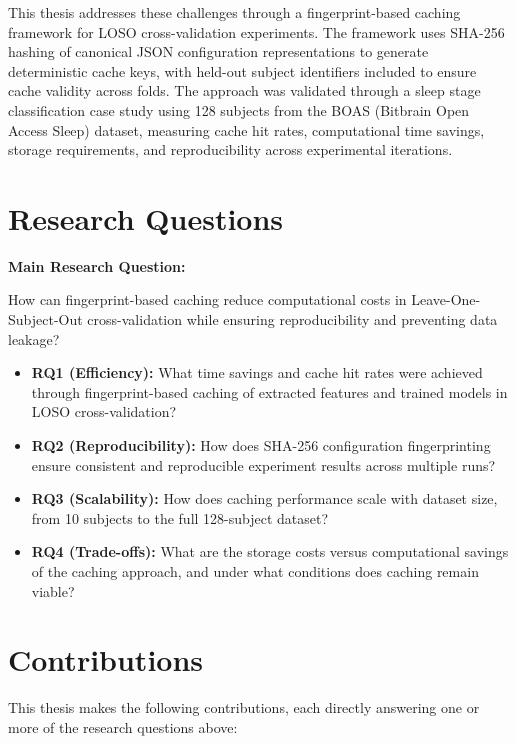 This thesis addresses these challenges through a fingerprint-based caching
framework for LOSO cross-validation experiments. The framework uses SHA-256
hashing of canonical JSON configuration representations to generate deterministic
cache keys, with held-out subject identifiers included to ensure cache validity
across folds. The approach was validated through a sleep stage classification
case study using 128 subjects from the BOAS (Bitbrain Open Access Sleep)
dataset, measuring cache hit rates, computational time savings, storage
requirements, and reproducibility across experimental iterations.


\section{Research Questions}

\textbf{Main Research Question:}

How can fingerprint-based caching reduce computational costs in
Leave-One-Subject-Out cross-validation while ensuring reproducibility
and preventing data leakage?

\begin{itemize}
\item \textbf{RQ1 (Efficiency):} What time savings and cache hit rates were
achieved through fingerprint-based caching of extracted features and trained
models in LOSO cross-validation?
\item \textbf{RQ2 (Reproducibility):} How does SHA-256 configuration
fingerprinting ensure consistent and reproducible experiment results across
multiple runs?
\item \textbf{RQ3 (Scalability):} How does caching performance scale with
dataset size, from 10 subjects to the full 128-subject dataset?
\item \textbf{RQ4 (Trade-offs):} What are the storage costs versus
computational savings of the caching approach, and under what conditions
does caching remain viable?
\end{itemize}

\section{Contributions}

This thesis makes the following contributions, each directly answering one
or more of the research questions above:

